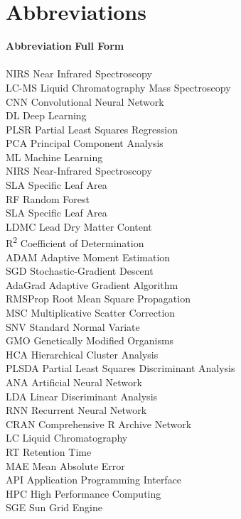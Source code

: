 \documentclass[12pt,a4paper]{report}
\begin{document}
\newpage
\tableofcontents

\newpage
\section*{Abbreviations}
\begin{tabbing}
    \textbf{Abbreviation} \hspace{2cm} \= \textbf{Full Form} \\
    \\
    NIRS \> Near Infrared Spectroscopy \\
    LC-MS \> Liquid Chromatography Mass Spectroscopy \\
    CNN \> Convolutional Neural Network \\
    DL \> Deep Learning \\
    PLSR \> Partial Least Squares Regression \\
    PCA \> Principal Component Analysis \\
    ML \> Machine Learning \\
    NIRS \> Near-Infrared Spectroscopy \\
    SLA \> Specific Leaf Area \\
    RF \> Random Forest \\
    SLA \> Specific Leaf Area \\
    LDMC \> Lead Dry Matter Content \\
    R\textsuperscript{2} \> Coefficient of Determination \\
    ADAM \> Adaptive Moment Estimation \\
    SGD \> Stochastic-Gradient Descent \\
    AdaGrad \> Adaptive Gradient Algorithm \\
    RMSProp \> Root Mean Square Propagation \\
    MSC \> Multiplicative Scatter Correction \\
    SNV \> Standard Normal Variate \\
    GMO \> Genetically Modified Organisms \\
    HCA \> Hierarchical Cluster Analysis \\
    PLSDA  \> Partial Least Squares Discriminant Analysis \\
    ANA \>  Artificial Neural Network \\
    LDA \> Linear Discriminant Analysis \\
    RNN \> Recurrent Neural Network \\
    CRAN \> Comprehensive R Archive Network \\
    LC \> Liquid Chromatography \\
    RT \> Retention Time \\
    MAE \> Mean Absolute Error \\
    API \> Application Programming Interface \\
    HPC \> High Performance Computing \\
    SGE \> Sun Grid Engine \\
    
\end{tabbing}
\end{document}
